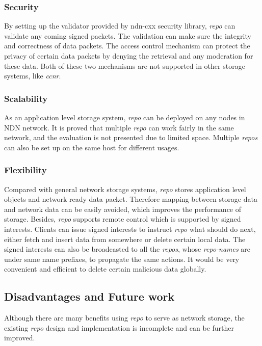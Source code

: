 \documentclass[conference]{IEEEtran}
\begin{document}
\subsubsection{Security}

By setting up the validator provided by ndn-cxx security library, \emph{repo} can validate any coming signed packets. The validation can make sure the integrity and correctness of data packets. The access control mechanism can protect the privacy of certain data packets by denying the retrieval and any moderation for these data. Both of these two mechanisms are not supported in other storage systems, like \emph{ccnr}.

\subsubsection{Scalability}

As an application level storage system, \emph{repo} can be deployed on any nodes in NDN network. It is proved that multiple \emph{repo} can work fairly in the same network, and the evaluation is not presented due to limited space. Multiple \emph{repos} can also be set up on the same host for different usages.

\subsubsection{Flexibility}

Compared with general network storage systems, \emph{repo} stores application level objects and network ready data packet. Therefore mapping between storage data and network data can be easily avoided, which improves the performance of storage. Besides, \emph{repo} supports remote control which is supported by signed interests. Clients can issue signed interests to instruct \emph{repo} what should do next, either fetch and insert data from somewhere or delete certain local data. The signed interests can also be broadcasted to all the \emph{repos}, whose \emph{repo-names} are under same name prefixes, to propagate the same actions. It would be very convenient and efficient to delete certain malicious data globally.

\subsection{Disadvantages and Future work}

Although there are many benefits using \emph{repo} to serve as network storage, the existing \emph{repo} design and implementation is incomplete and can be further improved.
\end{document}
